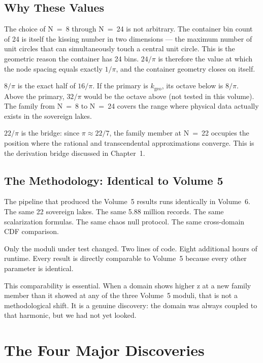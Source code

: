 \documentclass[11pt, letterpaper, openany]{book}
\begin{document}
\section*{Why These Values}

The choice of N~=~8 through N~=~24 is not arbitrary.
The container bin count of 24 is itself the kissing number in two dimensions --- the maximum number of unit circles that can simultaneously touch a central unit circle.
This is the geometric reason the container has 24 bins. $24/\pi$ is therefore the value at which the node spacing equals exactly $1/\pi$, and the container geometry closes on itself.

$8/\pi$ is the exact half of $16/\pi$. If the primary is $k_\text{geo}$, its octave below is $8/\pi$.
Above the primary, $32/\pi$ would be the octave above (not tested in this volume).
The family from N~=~8 to N~=~24 covers the range where physical data actually exists in the sovereign lakes.

$22/\pi$ is the bridge: since $\pi \approx 22/7$, the family member at N~=~22 occupies the position where the rational and transcendental approximations converge.
This is the derivation bridge discussed in Chapter~1.

\section*{The Methodology: Identical to Volume 5}

The pipeline that produced the Volume~5 results runs identically in Volume~6.
The same 22 sovereign lakes. The same 5.88 million records. The same scalarization formulas. The same chaos null protocol.
The same cross-domain CDF comparison.

Only the moduli under test changed. Two lines of code. Eight additional hours of runtime.
Every result is directly comparable to Volume~5 because every other parameter is identical.

This comparability is essential.
When a domain shows higher z at a new family member than it showed at any of the three Volume~5 moduli, that is not a methodological shift.
It is a genuine discovery: the domain was always coupled to that harmonic, but we had not yet looked.

\chapter{The Four Major Discoveries}
\end{document}
